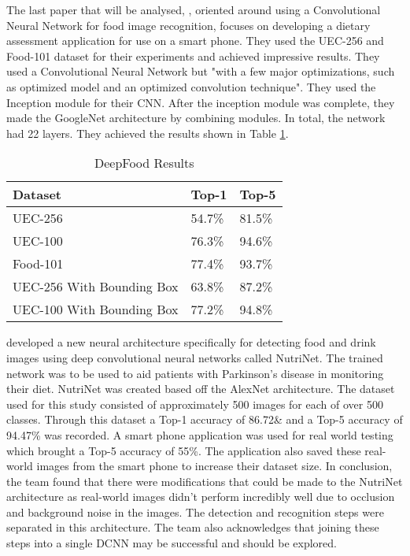 The last paper that will be analysed, \parencite{deepFood}, oriented around using a Convolutional Neural
Network for food image recognition, focuses on developing a dietary assessment
application for use on a smart phone. They used the UEC-256 and Food-101 dataset
for their experiments and achieved impressive results.
They used a Convolutional Neural Network but "with a few major optimizations,
such as optimized model and an optimized convolution technique". 
They used the Inception module for their CNN. After the
inception module was complete, they made the GoogleNet architecture by combining modules. In
total, the network had 22 layers.
They achieved the results shown in Table \ref{resultsDeepFood}.

\begin{table}[h]
	\centering
	\caption{DeepFood Results}
	\label{resultsDeepFood}
	\begin{tabular}{|l|l|l|}
	\hline
		\textbf{Dataset} & \textbf{Top-1}  & \textbf{Top-5}  \\  \hline
		UEC-256                   & 54.7\% & 81.5\% \\ \hline
		UEC-100                   & 76.3\% & 94.6\% \\ \hline
		Food-101                  & 77.4\% & 93.7\% \\ \hline
		UEC-256 With Bounding Box & 63.8\% & 87.2\% \\ \hline
		  UEC-100 With Bounding Box & 77.2\% & 94.8\% \\ \hline
	\end{tabular}
\end{table}

\parencite{nutrinet} developed a new neural architecture specifically for detecting food and drink images using deep convolutional neural networks called NutriNet.
The trained network was to be used to aid patients with Parkinson's disease in monitoring their diet.
NutriNet was created based off the AlexNet architecture.
The dataset used for this study consisted of approximately 500 images for each of over 500 classes.
Through this dataset a Top-1 accuracy of 86.72\& and a Top-5 accuracy of 94.47\% was recorded.
A smart phone application was used for real world testing which brought a Top-5 accuracy of 55\%.
The application also saved these real-world images from the smart phone to increase their dataset size.
In conclusion, the team found that there were modifications that could be made to the NutriNet architecture as real-world images didn't perform incredibly well due to occlusion and background noise in the images.
The detection and recognition steps were separated in this architecture.
The team also acknowledges that joining these steps into a single DCNN may be successful and should be explored.


